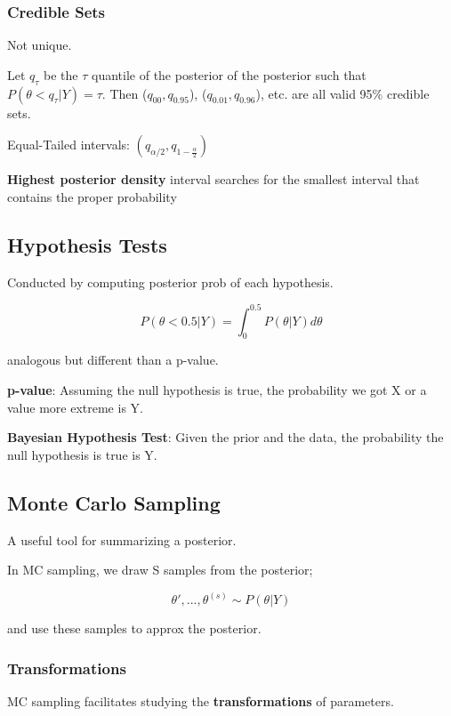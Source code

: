 \documentclass[11pt]{article}
\begin{document}
\subsubsection{Credible Sets}
\label{sec:org32a9b3c}

Not unique.

Let \(q_\tau\) be the \(\tau\) quantile of the posterior of the posterior such that
\(P(\theta < q_\tau | Y) = \tau\). Then (\(q_{00}, q_{0.95}\)), (\(q_{0.01},
q_{0.96}\)), etc. are all valid 95\% credible sets.

Equal-Tailed intervals: \((q_{\alpha/2}, q_{1 - \frac{\alpha}{2}})\)

\textbf{Highest posterior density} interval searches for the smallest interval  that
contains the proper probability

\subsection{Hypothesis Tests}
\label{sec:org6223285}

Conducted by computing posterior prob of each hypothesis.

$$
P(\theta < 0.5 | Y) = \int_{0}^{0.5} P(\theta | Y) d \theta
$$

analogous but different than a p-value.

\textbf{p-value}: Assuming the null hypothesis is true, the probability we got X or a
value more extreme is Y.

\textbf{Bayesian Hypothesis Test}: Given the prior and the data, the probability the null
hypothesis is true is Y.

\subsection{Monte Carlo Sampling}
\label{sec:org1e6b5e7}

A useful tool for summarizing a posterior.

In MC sampling, we draw S samples from the posterior;

$$
\theta', ..., \theta^{(s)} \sim P(\theta | Y)
$$

and use these samples to approx the posterior.

\subsubsection{Transformations}
\label{sec:org81e13ee}

MC sampling facilitates studying the \textbf{transformations} of parameters.
\end{document}
